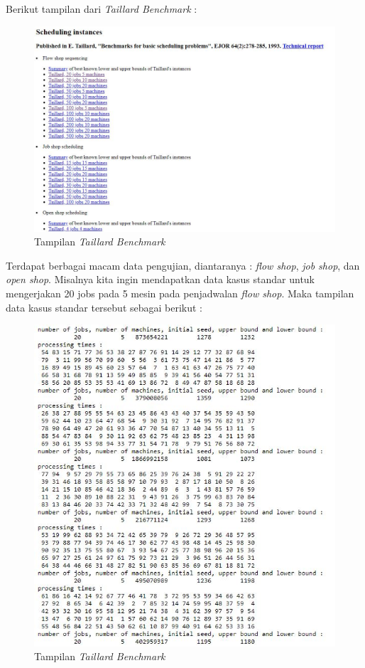 \documentclass[a4paper,twoside]{article}
\begin{document}
\begin{enumerate}
\begin{itemize}
		Berikut tampilan dari {\it Taillard Benchmark} :
		
		\begin{figure}[H]
			\centering
			\includegraphics[scale=0.70]{gambar9}
			\caption[TaillardBenchmatk] {Tampilan {\it Taillard Benchmark}}
			\label{fig:taillardbenchmark}
		\end{figure}
		
		Terdapat berbagai macam data pengujian, diantaranya : {\it flow shop}, {\it job shop}, dan {\it open shop}. Misalnya kita ingin mendapatkan data kasus standar untuk mengerjakan 20 jobs pada 5 mesin pada penjadwalan {\it flow shop}. Maka tampilan data kasus standar tersebut sebagai berikut :
		
		\begin{figure}[H]
			\centering
			\includegraphics[scale=0.70]{gambar10}
			\caption[TaillardBenchmatk] {Tampilan {\it Taillard Benchmark}}
			\label{fig:taillardbenchmark}
		\end{figure}
		

\end{itemize}
\end{enumerate}
\end{document}
